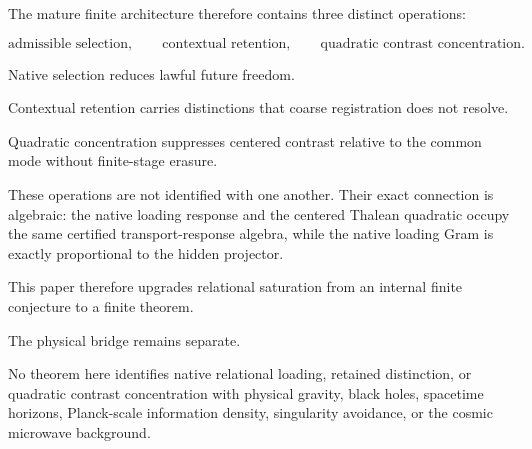 The mature finite architecture therefore contains three distinct
operations:

\[
\text{admissible selection},
\qquad
\text{contextual retention},
\qquad
\text{quadratic contrast concentration}.
\]

Native selection reduces lawful future freedom.

Contextual retention carries distinctions that coarse registration
does not resolve.

Quadratic concentration suppresses centered contrast relative to the
common mode without finite-stage erasure.

These operations are not identified with one another.  Their exact
connection is algebraic: the native loading response and the centered
Thalean quadratic occupy the same certified transport-response
algebra, while the native loading Gram is exactly proportional to the
hidden projector.

This paper therefore upgrades relational saturation from an internal
finite conjecture to a finite theorem.

The physical bridge remains separate.

No theorem here identifies native relational loading, retained
distinction, or quadratic contrast concentration with physical
gravity, black holes, spacetime horizons, Planck-scale information
density, singularity avoidance, or the cosmic microwave background.

